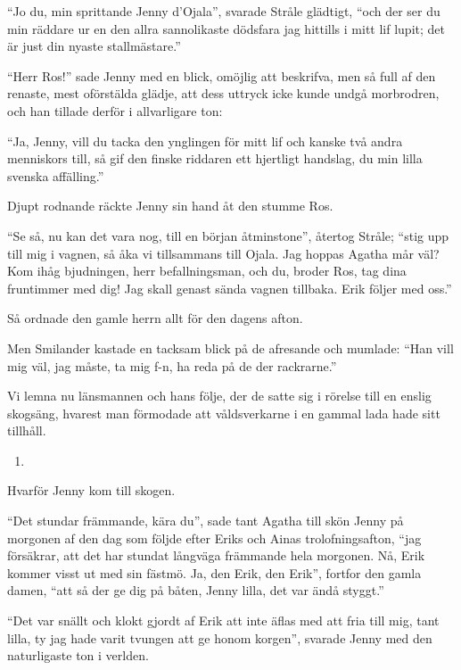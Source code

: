 ``Jo du, min sprittande Jenny d'Ojala'', svarade Stråle glädtigt, ``och
der ser du min räddare ur en den allra sannolikaste dödsfara jag
hittills i mitt lif lupit; det är just din nyaste stallmästare.''

``Herr Ros!'' sade Jenny med en blick, omöjlig att beskrifva, men så
full af den renaste, mest oförstälda glädje, att dess uttryck icke kunde
undgå morbrodren, och han tillade derför i allvarligare ton:

``Ja, Jenny, vill du tacka den ynglingen för mitt lif och kanske två
andra menniskors till, så gif den finske riddaren ett hjertligt
handslag, du min lilla svenska affälling.''

Djupt rodnande räckte Jenny sin hand åt den stumme Ros.

``Se så, nu kan det vara nog, till en början åtminstone'', återtog
Stråle; ``stig upp till mig i vagnen, så åka vi tillsammans till Ojala.
Jag hoppas Agatha mår väl? Kom ihåg bjudningen, herr befallningsman, och
du, broder Ros, tag dina fruntimmer med dig! Jag skall genast sända
vagnen tillbaka. Erik följer med oss.''

Så ordnade den gamle herrn allt för den dagens afton.

Men Smilander kastade en tacksam blick på de afresande och mumlade:
``Han vill mig väl, jag måste, ta mig f-n, ha reda på de der
rackrarne.''

Vi lemna nu länsmannen och hans följe, der de satte sig i rörelse till
en enslig skogsäng, hvarest man förmodade att våldsverkarne i en gammal
lada hade sitt tillhåll.

\begin{enumerate}
\def\labelenumi{\arabic{enumi}.}
\setcounter{enumi}{23}
\tightlist
\item
\end{enumerate}

Hvarför Jenny kom till skogen.

``Det stundar främmande, kära du'', sade tant Agatha till skön Jenny på
morgonen af den dag som följde efter Eriks och Ainas trolofningsafton,
``jag försäkrar, att det har stundat långväga främmande hela morgonen.
Nå, Erik kommer visst ut med sin fästmö. Ja, den Erik, den Erik'',
fortfor den gamla damen, ``att så der ge dig på båten, Jenny lilla, det
var ändå styggt.''

``Det var snällt och klokt gjordt af Erik att inte äflas med att fria
till mig, tant lilla, ty jag hade varit tvungen att ge honom korgen'',
svarade Jenny med den naturligaste ton i verlden.

